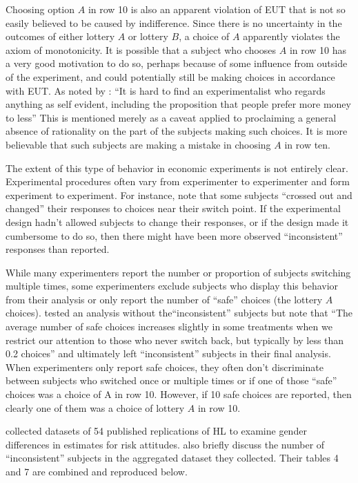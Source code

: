 \documentclass[../main.tex]{subfiles}
\begin{document}
Choosing option $A$ in row 10 is also an apparent violation of EUT that is not so easily believed to be caused by indifference.
Since there is no uncertainty in the outcomes of either lottery $A$ or lottery $B$, a choice of $A$ apparently violates the axiom of monotonicity.
It is possible that a subject who chooses $A$ in row 10 has a very good motivation to do so, perhaps because of some influence from outside of the experiment, and could potentially still be making choices in accordance with EUT.
As noted by \textcite[930]{Smith1982}: \enquote{It is hard to find an experimentalist who regards anything as self evident, including the proposition that people prefer more money to less}
This is mentioned merely as a caveat applied to proclaiming a general absence of rationality on the part of the subjects making such choices. 
It is more believable that such subjects are making a mistake in choosing $A$ in row ten.

The extent of this type of behavior in economic experiments is not entirely clear.
Experimental procedures often vary from experimenter to experimenter and form experiment to experiment.
For instance, \textcite{Holt2002} note that some subjects \enquote{crossed out and changed} their responses to choices near their switch point.
If the experimental design hadn't allowed subjects to change their responses, or if the design made it cumbersome to do so, then there might have been more observed \enquote{inconsistent} responses than reported. 

While many experimenters report the number or proportion of subjects switching multiple times, some experimenters exclude subjects who display this behavior from their analysis or only report the number of \enquote{safe} choices (the lottery $A$ choices).
\textcite[1648]{Holt2002} tested an analysis without the\enquote{inconsistent} subjects but note that \enquote{The average number of safe choices increases slightly in some treatments when we restrict our attention to those who never switch back, but typically by less than 0.2 choices} and ultimately left \enquote{inconsistent} subjects in their final analysis.
When experimenters only report safe choices, they often don't discriminate between subjects who switched once or multiple times or if one of those \enquote{safe} choices was a choice of A in row 10.
However, if 10 safe choices are reported, then clearly one of them was a choice of lottery $A$ in row 10.

\textcite[9]{Filippin2016} collected datasets of 54 published replications of HL to examine gender differences in estimates for risk attitudes.
\textcite[10-11, 17-18]{Filippin2016} also briefly discuss the number of \enquote{inconsistent} subjects in the aggregated dataset they collected.
Their tables 4 and 7 are combined and reproduced below.
\end{document}
